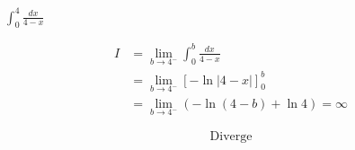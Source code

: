 $\displaystyle \int_{0}^{4} \frac{dx}{4-x}$

\nopagebreak
\begin{align*}
I &= \lim_{b \to 4^-} \int_{0}^{b} \frac{dx}{4-x} \\
&= \lim_{b \to 4^-} [-\ln|4-x|]_{0}^{b} \\
&= \lim_{b \to 4^-} (-\ln(4-b) + \ln 4) = \infty
\end{align*}

\[
\boxed{\displaystyle \text{Diverge}}
\]

